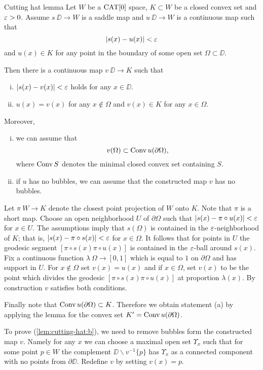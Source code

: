\documentclass[a4paper,10pt]{amsart}
\begin{document}
\begin{thm}{Cutting hat lemma}\label{lem:cutting-hat}
Let 
$W$ be a $\mathop{\rm CAT}\nolimits[0]$ space, 
$K\subset W$ be a closed convex set 
and $\varepsilon>0$.
Assume $s\:\DD\to W$ is a saddle map 
and $u\:\DD\to W$ is a continuous map such that 
\[|s(x)-u(x)|<\varepsilon\]
and $u(x)\in K$ for any point in the boundary of some open set $\Omega\subset \DD$.

Then there is a continuous map $v\:\DD\to K$ such that 
\begin{enumerate}[(i)]
\item $|s(x)-v(x)|<\varepsilon$ holds for any $x\in\DD$.
\item $u(x)=v(x)$ for any $x\notin\Omega$ and
$v(x)\in K$ for any $x\in\Omega$.
\end{enumerate}

\medskip

Moreover,
\begin{enumerate}[(i)]
\addtocounter{enumi}{2}
\item we can assume that \[v(\Omega)\subset \mathop{\rm Conv}\nolimits u(\partial\Omega),\]
where $\mathop{\rm Conv}\nolimits S$ denotes the minimal closed convex set containing $S$.
\item\label{lem:cutting-hat:b} if $u$ has no bubbles, we can assume that the constructed map $v$ has no bubbles.
\end{enumerate}
\end{thm}

Let $\pi\:W\to K$ denote the closest point projection of $W$ onto $K$. Note that $\pi$
is a short map. Choose an open neighborhood $U$ of $\partial \Omega$ such that 
$|s(x)-\pi\circ u(x)|<\varepsilon$ for $x\in U$. The assumptions imply that $s(\Omega)$ is 
contained in the $\varepsilon$-neighborhood of $K$;
that is, $|s(x)-\pi\circ s(x)|<\varepsilon$ for $x\in\Omega$.
It follows that for points in $U$ the geodesic segment $[\pi\circ s(x)\pi\circ u(x)]$ is contained in the $\varepsilon$-ball
around $s(x)$. Fix a continuous function $\lambda\:\Omega\to [0,1]$
which is equal to $1$ on $\partial \Omega$ and has support in $U$.
For $x\notin \Omega$ set $v(x)=u(x)$ and if 
$x\in \Omega$, set $v(x)$ to be the point which divides the geodesic $[\pi\circ s(x)\pi\circ u(x)]$
at proportion $\lambda(x)$. By construction $v$ satisfies both conditions.

Finally note that $\mathop{\rm Conv}\nolimits u(\partial\Omega)\subset K$. 
Therefore we obtain statement (a) 
by applying the lemma for the convex set $K'=\mathop{\rm Conv}\nolimits u(\partial\Omega)$.

To prove (\ref{lem:cutting-hat:b}), we need to remove bubbles form the constructed map $v$.
Namely for any $x$ we can choose a maximal open set $\Upsilon_x$ such that for some point $p\in W$ the complement $\DD\backslash v^{-1}\{p\}$ has $\Upsilon_x$ as a
connected component with no points from $\partial \DD$.
Redefine $v$ by setting $v(x)=p$.
\qeds
\end{document}
